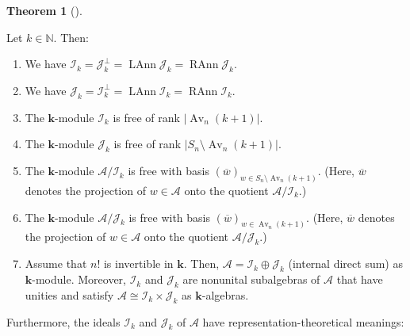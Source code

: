 \documentclass[numbers=enddot,12pt,final,onecolumn,notitlepage]{scrartcl}%
\numberwithin{exer}{subsection}
\theoremstyle{definition}
\newtheorem{theo}{Theorem}[subsection]
\newenvironment{theorem}[1][]
{\begin{theo}[#1]\begin{leftbar}}
{\end{leftbar}\end{theo}}
\begin{document}
\begin{theorem}
\label{thm.row.main}Let $k\in\mathbb{N}$. Then:

\begin{enumerate}
\item[\textbf{(a)}] We have $\mathcal{I}_{k}=\mathcal{J}_{k}^{\perp
}=\operatorname*{LAnn}\mathcal{J}_{k}=\operatorname*{RAnn}\mathcal{J}_{k}$.

\item[\textbf{(b)}] We have $\mathcal{J}_{k}=\mathcal{I}_{k}^{\perp
}=\operatorname*{LAnn}\mathcal{I}_{k}=\operatorname*{RAnn}\mathcal{I}_{k}$.

\item[\textbf{(c)}] The $\mathbf{k}$-module $\mathcal{I}_{k}$ is free of rank
$\left\vert \operatorname*{Av}\nolimits_{n}\left(  k+1\right)  \right\vert $.

\item[\textbf{(d)}] The $\mathbf{k}$-module $\mathcal{J}_{k}$ is free of rank
$\left\vert S_{n}\setminus\operatorname*{Av}\nolimits_{n}\left(  k+1\right)
\right\vert $.

\item[\textbf{(e)}] The $\mathbf{k}$-module $\mathcal{A}/\mathcal{I}_{k}$ is
free with basis $\left(  \overline{w}\right)  _{w\in S_{n}\setminus
\operatorname*{Av}\nolimits_{n}\left(  k+1\right)  }$. (Here, $\overline{w}$
denotes the projection of $w\in\mathcal{A}$ onto the quotient $\mathcal{A}%
/\mathcal{I}_{k}$.)

\item[\textbf{(f)}] The $\mathbf{k}$-module $\mathcal{A}/\mathcal{J}_{k}$ is
free with basis $\left(  \overline{w}\right)  _{w\in\operatorname*{Av}%
\nolimits_{n}\left(  k+1\right)  }$. (Here, $\overline{w}$ denotes the
projection of $w\in\mathcal{A}$ onto the quotient $\mathcal{A}/\mathcal{J}%
_{k}$.)

\item[\textbf{(g)}] Assume that $n!$ is invertible in $\mathbf{k}$. Then,
$\mathcal{A}=\mathcal{I}_{k}\oplus\mathcal{J}_{k}$ (internal direct sum) as
$\mathbf{k}$-module. Moreover, $\mathcal{I}_{k}$ and $\mathcal{J}_{k}$ are
nonunital subalgebras of $\mathcal{A}$ that have unities and satisfy
$\mathcal{A}\cong\mathcal{I}_{k}\times\mathcal{J}_{k}$ as $\mathbf{k}$-algebras.\footnotemark
\end{enumerate}
\end{theorem}

Furthermore, the
ideals $\mathcal{I}_{k}$ and $\mathcal{J}_{k}$ of $\mathcal{A}$ have
representation-theoretical meanings:
\end{document}
